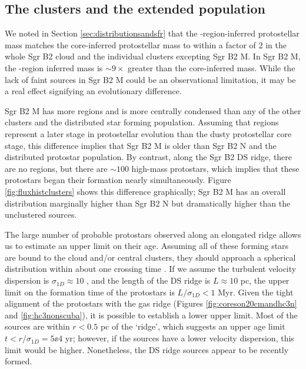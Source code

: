 \documentclass[twocolumn]{aastex61}
\begin{document}
\subsection{The clusters and the extended population}
\label{sec:clustersandextended}
We noted in Section \ref{sec:distributionsandsfr} that the \hii-region-inferred
protostellar mass matches the core-inferred protostellar mass to within a
factor of 2 in the whole Sgr B2 cloud and the individual clusters excepting Sgr
B2 M.  In Sgr B2 M, the \hii-region inferred mass is $\sim9\times$ greater than
the core-inferred mass.  While the lack of faint sources in Sgr B2 M could
be an observational limitation, it may be a real effect signifying an evolutionary
difference.

Sgr B2 M has more \hii regions and is more centrally condensed than any of the
other clusters and the distributed star forming population.  Assuming that \hii
regions represent a later stage in protostellar evolution than the dusty
protostellar core stage, this difference implies that Sgr B2 M is older than
Sgr B2 N and the distributed protostar population.  By contrast, along the Sgr
B2 DS ridge, there are no \hii regions, but there are $\sim100$ high-mass
protostars, which implies that these protostars began their formation nearly
simultaneously.  Figure \ref{fig:fluxhistclusters} shows this difference
graphically; Sgr B2 M has an overall distribution marginally higher than Sgr B2
N but dramatically higher than the unclustered sources.

The large number of probable protostars observed along an elongated ridge
allows us to estimate an upper limit on their age.  Assuming all of these
forming stars are bound to the cloud and/or central clusters, they should
approach a spherical distribution within about one crossing time
\citep{Efremov1998a}.  If we assume the turbulent velocity dispersion is
$\sigma_{1D}\approx10$ \kms \citep[e.g.][]{Henshaw2016a}, and the length of the
DS ridge is $L\approx10$ pc, the upper limit on the formation time of the
protostars is $L/\sigma_{1D}<1$ Myr.  Given the tight alignment of the
protostars with the gas ridge (Figures \ref{fig:coreson20cmandhc3n} and
\ref{fig:hc3nonscuba}), it is  possible to establish a lower upper
limit.  Most of the sources are within $r<0.5$ pc of the `ridge', which
suggests an upper age limit $t<r/\sigma_{1D}=5\ee{4}$ yr; however, if
the sources have a lower velocity dispersion, this limit would be higher.
Nonetheless, the DS ridge sources appear to be recently formed.
\end{document}

